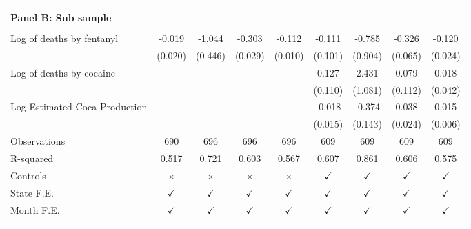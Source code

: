 \begin{tabular}{lcccccccc}
 \hline  & & & & &  &  &  &  \\ \textbf{Panel B: Sub sample} \\ & & & & & & & & \\
Log of deaths by fentanyl&      -0.019         &      -1.044\sym{*}  &      -0.303\sym{***}&      -0.112\sym{***}&      -0.111         &      -0.785         &      -0.326\sym{***}&      -0.120\sym{***}\\
                    &     (0.020)         &     (0.446)         &     (0.029)         &     (0.010)         &     (0.101)         &     (0.904)         &     (0.065)         &     (0.024)         \\
\addlinespace
Log of deaths by cocaine&                     &                     &                     &                     &       0.127         &       2.431\sym{*}  &       0.079         &       0.018         \\
                    &                     &                     &                     &                     &     (0.110)         &     (1.081)         &     (0.112)         &     (0.042)         \\
\addlinespace
Log Estimated Coca Production&                     &                     &                     &                     &      -0.018         &      -0.374\sym{**} &       0.038         &       0.015\sym{*}  \\
                    &                     &                     &                     &                     &     (0.015)         &     (0.143)         &     (0.024)         &     (0.006)         \\
\arrayrulecolor{black!10}\midrule
Observations        &         690         &         696         &         696         &         696         &         609         &         609         &         609         &         609         \\
R-squared           &       0.517         &       0.721         &       0.603         &       0.567         &       0.607         &       0.861         &       0.606         &       0.575         \\
Controls            &    $\times$         &    $\times$         &    $\times$         &    $\times$         &$\checkmark$         &$\checkmark$         &$\checkmark$         &$\checkmark$         \\
State F.E.          &$\checkmark$         &$\checkmark$         &$\checkmark$         &$\checkmark$         &$\checkmark$         &$\checkmark$         &$\checkmark$         &$\checkmark$         \\
Month F.E.          &$\checkmark$         &$\checkmark$         &$\checkmark$         &$\checkmark$         &$\checkmark$         &$\checkmark$         &$\checkmark$         &$\checkmark$         \\
\arrayrulecolor{black}\bottomrule
\end{tabular}
